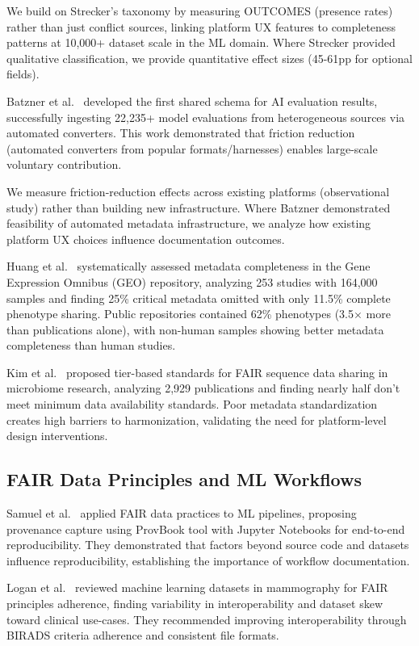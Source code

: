 We build on Strecker's taxonomy by measuring OUTCOMES (presence rates) rather than just conflict sources, linking platform UX features to completeness patterns at 10,000+ dataset scale in the ML domain. Where Strecker provided qualitative classification, we provide quantitative effect sizes (45-61pp for optional fields).

Batzner et al.~\cite{batzner2026shared} developed the first shared schema for AI evaluation results, successfully ingesting 22,235+ model evaluations from heterogeneous sources via automated converters. This work demonstrated that friction reduction (automated converters from popular formats/harnesses) enables large-scale voluntary contribution.

We measure friction-reduction effects across existing platforms (observational study) rather than building new infrastructure. Where Batzner demonstrated feasibility of automated metadata infrastructure, we analyze how existing platform UX choices influence documentation outcomes.

Huang et al.~\cite{huang2025systematic} systematically assessed metadata completeness in the Gene Expression Omnibus (GEO) repository, analyzing 253 studies with 164,000 samples and finding 25\% critical metadata omitted with only 11.5\% complete phenotype sharing. Public repositories contained 62\% phenotypes (3.5$\times$ more than publications alone), with non-human samples showing better metadata completeness than human studies.

Kim et al.~\cite{kim2025tier} proposed tier-based standards for FAIR sequence data sharing in microbiome research, analyzing 2,929 publications and finding nearly half don't meet minimum data availability standards. Poor metadata standardization creates high barriers to harmonization, validating the need for platform-level design interventions.

\subsection{FAIR Data Principles and ML Workflows}

Samuel et al.~\cite{samuel2020applying} applied FAIR data practices to ML pipelines, proposing provenance capture using ProvBook tool with Jupyter Notebooks for end-to-end reproducibility. They demonstrated that factors beyond source code and datasets influence reproducibility, establishing the importance of workflow documentation.

Logan et al.~\cite{logan2023review} reviewed machine learning datasets in mammography for FAIR principles adherence, finding variability in interoperability and dataset skew toward clinical use-cases. They recommended improving interoperability through BIRADS criteria adherence and consistent file formats.

